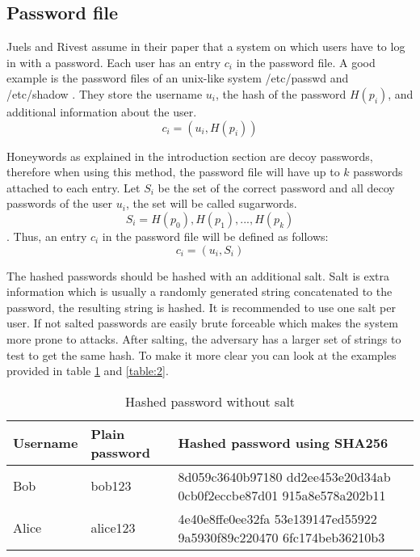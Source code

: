 \documentclass[../main.tex]{subfiles}
\begin{document}
\subsection{Password file} Juels and Rivest \cite{juels2013honeywords} assume
in their paper that a system on which users have to log in with a password. Each
user has an entry \(c_i\) in the password file. A good example is the password
files of an unix-like system /etc/passwd \cite{passwd} and /etc/shadow
\cite{shadow}. They store the username \(u_i\), the hash of the password
\(H(p_i)\), and additional information about the user. \[c_i = (u_i, H(p_i))\]

Honeywords as explained in the introduction section are decoy passwords,
therefore when using this method, the password file will have up to \(k\)
passwords attached to each entry. Let \(S_i\) be the set of the correct
password and all decoy passwords of the user \(u_i\), the set will be called
sugarwords. \[S_i = {H(p_0), H(p_1), ..., H(p_k)}\]. Thus, an entry \(c_i\)
in the password file will be defined as follows: \[c_i = (u_i, S_i)\]

The hashed passwords should be hashed with an additional salt. Salt is extra
information which is usually a randomly generated string concatenated to the
password, the resulting string is hashed. It is recommended to use one salt per
user. If not salted passwords are easily brute forceable which makes the system
more prone to attacks. After salting, the adversary has a larger set of strings
to test to get the same hash. To make it more clear you can look at the
examples provided in table \ref{table:1} and \ref{table:2}.


\begin{table}
  \centering
	\begin{tabularx}{0.5\textwidth}{|X|X|X|}
    \hline \textbf{Username} & \textbf{Plain password} & \textbf{Hashed password using SHA256} \\ \hline
    Bob & bob123 & 8d059c3640b97180
		   dd2ee453e20d34ab
		   0cb0f2eccbe87d01
		   915a8e578a202b11\\
    \hline
    Alice & alice123 & 4e40e8ffe0ee32fa
		       53e139147ed55922
		       9a5930f89c220470
		       6fc174beb36210b3\\
    \hline
  \end{tabularx}
  \caption{Hashed password without salt}
  \label{table:1}
\end{table}
\end{document}
